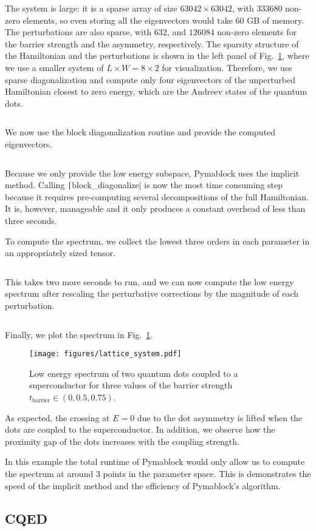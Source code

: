 The system is large: it is a sparse array of size $63042 \times 63042$, with
$333680$ non-zero elements, so even storing all the eigenvectors would take
$60$ GB of memory.
The perturbations are also sparse, with $632$, and $126084$ non-zero elements
for the barrier strength and the asymmetry, respectively.
The sparsity structure of the Hamiltonian and the perturbations is shown in the
left panel of Fig.~\ref{fig:QD_spectrum}, where we use a smaller system of $L
\times W = 8 \times 2$ for visualization.
Therefore, we use sparse diagonalization and compute only four eigenvectors of
the unperturbed Hamiltonian closest to zero energy, which are the Andreev
states of the quantum dots.
%
\inputminted[firstline=62, lastline=63]{ipython}{code_figures/lattice_system.py}
%
We now use the block diagonalization routine and provide the computed
eigenvectors.
%
\inputminted[firstline=65, lastline=65]{ipython}{code_figures/lattice_system.py}
%
Because we only provide the low energy subspace, Pymablock uses the implicit
method.
Calling \texttt|block_diagonalize| is now the most time consuming
step because it requires pre-computing several decompositions of the full
Hamiltonian.
It is, however, manageable and it only produces a constant overhead of less
than three seconds.

To compute the spectrum, we collect the lowest three orders in each parameter
in an appropriately sized tensor.
%
\inputminted[firstline=71, lastline=71]{ipython}{code_figures/lattice_system.py}
%
This takes two more seconds to run, and we can now compute the low energy
spectrum after rescaling the perturbative corrections by the magnitude of each
perturbation.
%
\inputminted[firstline=74, lastline=79]{ipython}{code_figures/lattice_system.py}
%
Finally, we plot the spectrum in Fig.~\ref{fig:QD_spectrum}.
%
\begin{figure}[h!]
\centering
\texttt{[image: figures/lattice\_system.pdf]}
\caption{Low energy spectrum of two quantum dots coupled to a superconductor
for three values of the barrier strength $t_{\text{barrier}} \in (0, 0.5, 0.75)$.
}
\label{fig:QD_spectrum}
\end{figure}
%
As expected, the crossing at $E=0$ due to the dot asymmetry is lifted when the
dots are coupled to the superconductor.
In addition, we observe how the proximity gap of the dots increases with the
coupling strength.

In this example the total runtime of Pymablock would only allow us to compute
the spectrum at around 3 points in the parameter space.
This is demonstrates the speed of the implicit method and the efficiency of
Pymablock's algorithm.

\subsection{CQED}
